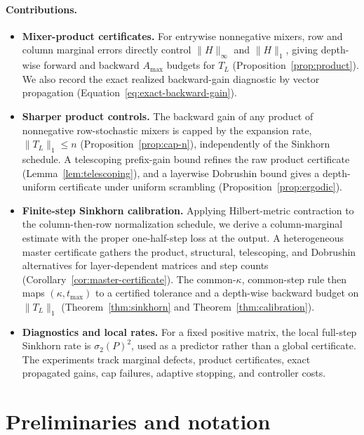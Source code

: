 \documentclass[10pt]{article}
\numberwithin{equation}{section}
\theoremstyle{plain}
\theoremstyle{definition}
\theoremstyle{remark}
\newcommand{\Amax}{\texorpdfstring{\ensuremath{A_{\max}}}{Amax}\xspace}
\begin{document}
\paragraph{Contributions.}\label{subsec:intro_contrib}
\begin{itemize}[leftmargin=*, itemsep=0.25em]
\item \textbf{Mixer-product certificates.}
For entrywise nonnegative mixers, row and column marginal errors directly
control \(\|H\|_\infty\) and \(\|H\|_1\), giving depth-wise forward and
backward \Amax budgets for \(T_L\) (Proposition~\ref{prop:product}).  We also
record the exact realized backward-gain diagnostic by vector propagation
(Equation~\eqref{eq:exact-backward-gain}).

\item \textbf{Sharper product controls.}
The backward gain of any product of nonnegative row-stochastic mixers is capped by
the expansion rate, \(\|T_L\|_1\le n\) (Proposition~\ref{prop:cap-n}), independently of
the Sinkhorn schedule. A telescoping prefix-gain bound refines the raw product
certificate (Lemma~\ref{lem:telescoping}), and a layerwise Dobrushin bound
gives a depth-uniform certificate under uniform scrambling
(Proposition~\ref{prop:ergodic}).

\item \textbf{Finite-step Sinkhorn calibration.}
Applying Hilbert-metric contraction to the column-then-row normalization schedule,
we derive a column-marginal estimate with the proper one-half-step loss at the
output. A heterogeneous master certificate gathers the product, structural,
telescoping, and Dobrushin alternatives for layer-dependent matrices and step
counts (Corollary~\ref{cor:master-certificate}). The common-\(\kappa\),
common-step rule then maps \((\kappa,t_{\max})\) to a certified tolerance and a
depth-wise backward budget on \(\|T_L\|_1\) (Theorem~\ref{thm:sinkhorn}
and Theorem~\ref{thm:calibration}).

\item \textbf{Diagnostics and local rates.}
For a fixed positive matrix, the local full-step Sinkhorn rate is
\(\sigma_2(P)^2\), used as a predictor rather than a global certificate. The
experiments track marginal defects, product certificates, exact propagated
gains, cap failures, adaptive stopping, and controller costs.
\end{itemize}

\section{Preliminaries and notation}\label{sec:setup}
\end{document}

